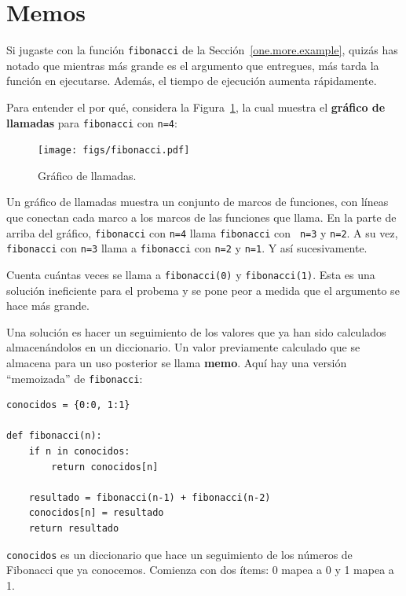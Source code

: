 \documentclass[10pt]{book}
\begin{document}
\section{Memos}
\label{memoize}

Si jugaste con la función {\tt fibonacci} de la
Sección~\ref{one.more.example}, quizás has notado que mientras más grande
es el argumento que entregues, más tarda la función en ejecutarse.
Además, el tiempo de ejecución aumenta rápidamente. 

Para entender el por qué, considera la Figura~\ref{fig.fibonacci}, la cual muestra
el {\bf gráfico de llamadas} para {\tt fibonacci} con {\tt n=4}:

\begin{figure}
\centerline
{\texttt{[image: figs/fibonacci.pdf]}}
\caption{Gráfico de llamadas.}
\label{fig.fibonacci}
\end{figure}

Un gráfico de llamadas muestra un conjunto de marcos de funciones, con líneas que conectan cada
marco a los marcos de las funciones que llama.  En la parte de arriba del
gráfico, {\tt fibonacci} con {\tt n=4} llama {\tt fibonacci} con {\tt
n=3} y {\tt n=2}.  A su vez, {\tt fibonacci} con {\tt n=3} llama a
{\tt fibonacci} con {\tt n=2} y {\tt n=1}.  Y así sucesivamente.

Cuenta cuántas veces se llama a {\tt fibonacci(0)} y {\tt fibonacci(1)}.
Esta es una solución ineficiente para el probema y se pone peor
a medida que el argumento se hace más grande.

Una solución es hacer un seguimiento de los valores que ya han sido
calculados almacenándolos en un diccionario.   Un valor previamente calculado
que se almacena para un uso posterior se llama {\bf memo}.  Aquí hay una versión
``memoizada'' de {\tt fibonacci}:

\begin{verbatim}
conocidos = {0:0, 1:1}

def fibonacci(n):
    if n in conocidos:
        return conocidos[n]

    resultado = fibonacci(n-1) + fibonacci(n-2)
    conocidos[n] = resultado
    return resultado
\end{verbatim}
%
{\tt conocidos} es un diccionario que hace un seguimiento de los números de Fibonacci
que ya conocemos.  Comienza con
dos ítems: 0 mapea a 0 y 1 mapea a 1.
\end{document}
